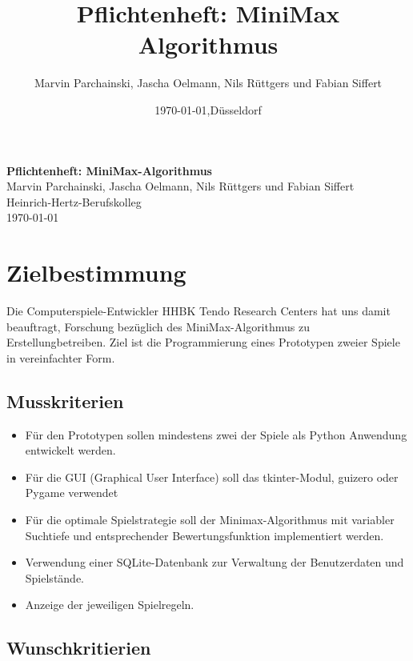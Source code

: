 \documentclass[14pt]{scrartcl}
\title{Pflichtenheft: MiniMax Algorithmus}
\author{Marvin Parchainski, Jascha Oelmann, Nils Rüttgers und Fabian Siffert}
\date{\today{},Düsseldorf}
\begin{document}
\onehalfspacing

\begin{titlepage}
    \begin{center}
    \textbf{
    \Huge{Pflichtenheft: MiniMax-Algorithmus}\\[15cm]
    }
    \Large{Marvin Parchainski, Jascha Oelmann, Nils Rüttgers und Fabian Siffert}\\[1cm]
    \large{Heinrich-Hertz-Berufskolleg\\{\today}}
    \end{center}
\end{titlepage}
\thispagestyle{empty}

 
\newpage

\tableofcontents
\thispagestyle{empty}

\newpage
\setcounter{page}{1}
\section{Zielbestimmung}
\label{sec:zielbestimmung}

Die Computerspiele-Entwickler HHBK Tendo Research Centers hat uns damit beauftragt, Forschung bezüglich des MiniMax-Algorithmus zu Erstellungbetreiben. Ziel ist die Programmierung eines Prototypen zweier Spiele in vereinfachter Form. \par 


\subsection{Musskriterien}

\begin{itemize}
    \item Für den Prototypen sollen mindestens zwei der Spiele als Python Anwendung entwickelt werden.
    \item Für die GUI (Graphical User Interface) soll das tkinter-Modul, guizero oder Pygame verwendet
    \item Für die optimale Spielstrategie soll der Minimax-Algorithmus mit variabler Suchtiefe und
    entsprechender Bewertungsfunktion implementiert werden.
    \item Verwendung einer SQLite-Datenbank zur Verwaltung der Benutzerdaten und Spielstände.
    \item Anzeige der jeweiligen Spielregeln.
\end{itemize}


\subsection{Wunschkritierien}
\end{document}
